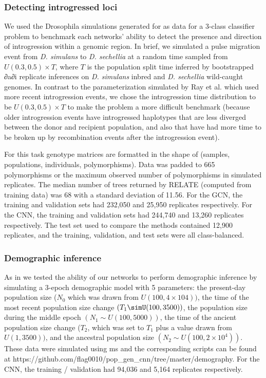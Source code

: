\subsubsection{Detecting introgressed loci}

We used the Drosophila simulations generated for \cite{rayIntroUNETIdentifyingIntrogressed2023} as data for a 3-class classifier problem to benchmark each networks’ ability to detect the presence and direction of introgression within a genomic region. In brief, we simulated a pulse migration event from \textit{D. simulans} to \textit{D. sechellia} at a random time sampled from $U(0.3, 0.5) \times T$, where $T$ is the population split time inferred by bootstrapped ∂a∂i \cite{gutenkunstDiffusionApproximationsDemographic2010} replicate inferences on \textit{D. simulans} inbred and \textit{D. sechellia} wild-caught genomes. In contrast to the parameterization simulated by Ray et al. \cite{rayIntroUNETIdentifyingIntrogressed2023} which used more recent introgression events, we chose the introgression time distribution to be $U(0.3, 0.5) \times T$ to make the problem a more difficult benchmark (because older introgression events have introgressed haplotypes that are less diverged between the donor and recipient population, and also that have had more time to be broken up by recombination events after the introgression event).

For this task genotype matrices are formatted in the shape of (samples, populations, individuals, polymorphisms). Data was padded to 665 polymorphisms or the maximum observed number of polymorphisms in simulated replicates. The median number of trees returned by RELATE (computed from training data) was 68 with a standard deviation of 11.56.  For the GCN, the training and validation sets had 232,050 and 25,950 replicates respectively.  For the CNN, the training and validation sets had 244,740 and 13,260 replicates respectively.  The test set used to compare the methods contained 12,900 replicates, and the training, validation, and test sets were all class-balanced.

\subsubsection{Demographic inference}

As in \cite{flagelUnreasonableEffectivenessConvolutional2019} we tested the ability of our networks to perform demographic inference by simulating a 3-epoch demographic model with 5 parameters: the present-day population size ($N_0$ which was drawn from $U(100, 4\times104))$, the time of the most recent population size change $(T_1 \simU(100, 3500))$, the population size during the middle epoch $(N_1 \sim U(100, 5000))$, the time of the ancient population size change ($T_2$, which was set to $T_1$ plus a value drawn from $U(1, 3500))$, and the ancestral population size $(N_2 \sim U(100, 2\times10^4))$. These data were simulated using ms and the corresponding scripts can be found at https://github.com/flag0010/pop\_gen\_cnn/tree/master/demography.  For the CNN, the training / validation had 94,036 and 5,164 replicates respectively.

